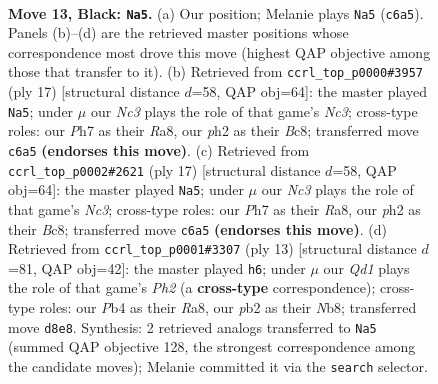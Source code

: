 \documentclass[11pt]{article}
\begin{document}
\begin{figure}[p]
\label{fig:thought-m23}
\end{figure}

\clearpage

\begin{figure}[p]\centering
\begin{subfigure}{0.46\textwidth}\centering
\resizebox{\linewidth}{!}{%
\newchessgame
\chessboard[
  setfen={r1bq1rk1/2p1bp1p/p1np1np1/4p3/PpB1P3/3P1Q1N/1PP2PPP/RNB1R1K1 b - - 1 13},
  showmover=false,
  pgfstyle=straightmove, color=movearrow, markmove={c6-a5}
]}
\caption{}
\end{subfigure}\hfill
\begin{subfigure}{0.46\textwidth}\centering
\resizebox{\linewidth}{!}{%
\newchessgame
\chessboard[
  setfen={r1bq1rk1/2p1bppp/p1np1n2/1p2p3/P3P3/1B1P1N2/1PP2PPP/RNBQR1K1 b - - 0 9},
  showmover=false,
  pgfstyle=straightmove, color=movearrow, markmove={c6-a5}
]}
\caption{}
\end{subfigure}
\\[4pt]
\begin{subfigure}{0.46\textwidth}\centering
\resizebox{\linewidth}{!}{%
\newchessgame
\chessboard[
  setfen={r1bq1rk1/2p1bppp/p1np1n2/1p2p3/P3P3/1B1P1N2/1PP2PPP/RNBQR1K1 b - - 0 9},
  showmover=false,
  pgfstyle=straightmove, color=movearrow, markmove={c6-a5}
]}
\caption{}
\end{subfigure}\hfill
\begin{subfigure}{0.46\textwidth}\centering
\resizebox{\linewidth}{!}{%
\newchessgame
\chessboard[
  setfen={rnbq1rk1/pp2bppp/2p1pn2/3p2B1/2PP4/1QN1PN2/PP3PPP/R3KB1R b KQ - 2 7},
  showmover=false,
  pgfstyle=straightmove, color=movearrow, markmove={h7-h6}
]}
\caption{}
\end{subfigure}
\caption{\textbf{Move 13, Black: \texttt{Na5}.} (a) Our position; Melanie plays \texttt{Na5} (\texttt{c6a5}). Panels (b)--(d) are the retrieved master positions whose correspondence most drove this move (highest QAP objective among those that transfer to it). (b) Retrieved from \texttt{ccrl\_top\_p0000\#3957} (ply 17) [structural distance $d$=58, QAP obj=64]: the master played \texttt{Na5}; under $\mu$ our \emph{Nc3} plays the role of that game's \emph{Nc3}; cross-type roles: our \emph{P}h7 as their \emph{R}a8, our \emph{p}h2 as their \emph{B}c8; transferred move \texttt{c6a5} \textbf{(endorses this move)}. (c) Retrieved from \texttt{ccrl\_top\_p0002\#2621} (ply 17) [structural distance $d$=58, QAP obj=64]: the master played \texttt{Na5}; under $\mu$ our \emph{Nc3} plays the role of that game's \emph{Nc3}; cross-type roles: our \emph{P}h7 as their \emph{R}a8, our \emph{p}h2 as their \emph{B}c8; transferred move \texttt{c6a5} \textbf{(endorses this move)}. (d) Retrieved from \texttt{ccrl\_top\_p0001\#3307} (ply 13) [structural distance $d$=81, QAP obj=42]: the master played \texttt{h6}; under $\mu$ our \emph{Qd1} plays the role of that game's \emph{Ph2} (a \textbf{cross-type} correspondence); cross-type roles: our \emph{P}b4 as their \emph{R}a8, our \emph{p}b2 as their \emph{N}b8; transferred move \texttt{d8e8}. Synthesis: 2 retrieved analogs transferred to \texttt{Na5} (summed QAP objective 128, the strongest correspondence among the candidate moves); Melanie committed it via the \texttt{search} selector.}

\end{figure}
\end{document}
